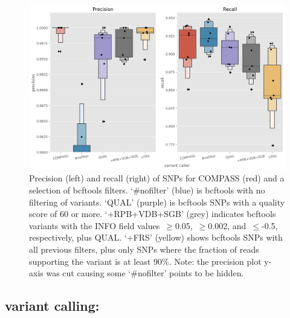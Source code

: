 \begin{figure}
\begin{center}
\includegraphics[width=0.70\columnwidth]{Chapter2/Figs/bcftools-precision-recall-filters.png}
\caption{{Precision (left) and recall (right) of SNPs for COMPASS (red) and a
selection of bcftools filters. `\#nofilter' (blue) is bcftools with no
filtering of variants. `QUAL' (purple) is bcftools SNPs with a quality score of
60 or more. `+RPB+VDB+SGB' (grey) indicates bcftools variants with the INFO
field values~\(\ge\)0.05,~\(\ge\)0.002,
and~\(\le\)-0.5, respectively, plus QUAL. `+FRS' (yellow) shows
bcftools SNPs with all previous filters, plus only SNPs where the
fraction of reads supporting the variant is at least 90\%. Note: the
precision plot y-axis was cut causing some `\#nofilter' points to be
hidden.
{\label{fig:bcftools-filters}}%
}}
\end{center}
\end{figure}


\subsection{\ont{} variant calling: \pandora{}}

